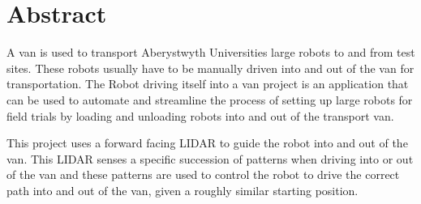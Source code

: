 \thispagestyle{empty}


\section*{\centering Abstract}



A van is used to transport Aberystwyth Universities large robots to and
from test sites. These robots usually have to be manually driven into
and out of the van for transportation. The Robot driving itself into a van
project is an application that can be used to automate and streamline the
process of setting up large robots for field trials by loading and unloading
robots into and out of the transport van.

This project uses a forward facing LIDAR to guide the robot into and out
of the van. This LIDAR senses a specific succession of patterns when
driving into or out of the van and these patterns are used to control the
robot to drive the correct path into and out of the van, given a roughly similar starting position.

